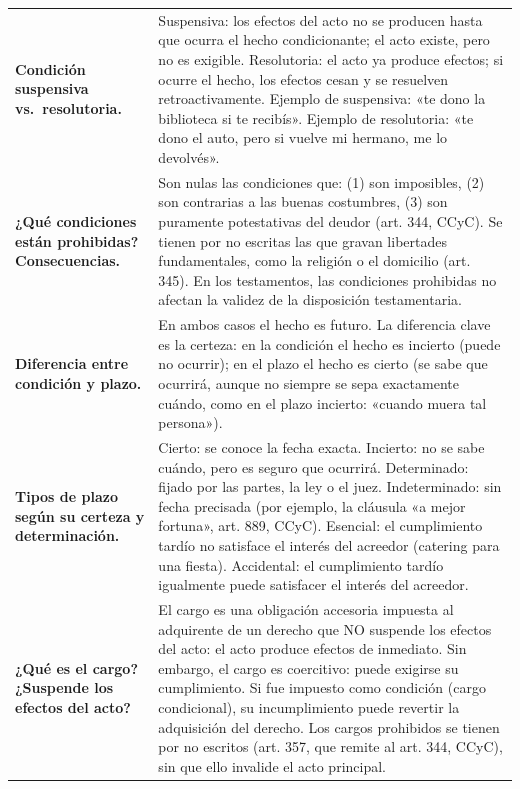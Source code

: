 \documentclass[12pt,oneside]{book}
\begin{document}
\begin{longtable}{
    >{\raggedright\arraybackslash}p{}
    >{\raggedright\arraybackslash}p{}
}
\textbf{Condición suspensiva vs.\ resolutoria.} &
Suspensiva: los efectos del acto no se producen hasta que ocurra el hecho condicionante; el acto existe, pero no es exigible. Resolutoria: el acto ya produce efectos; si ocurre el hecho, los efectos cesan y se resuelven retroactivamente. Ejemplo de suspensiva: «te dono la biblioteca si te recibís». Ejemplo de resolutoria: «te dono el auto, pero si vuelve mi hermano, me lo devolvés». \\

\textbf{¿Qué condiciones están prohibidas? Consecuencias.} &
Son nulas las condiciones que: (1) son imposibles, (2) son contrarias a las buenas costumbres, (3) son puramente potestativas del deudor (art. 344, CCyC). Se tienen por no escritas las que gravan libertades fundamentales, como la religión o el domicilio (art. 345). En los testamentos, las condiciones prohibidas no afectan la validez de la disposición testamentaria. \\

\textbf{Diferencia entre condición y plazo.} &
En ambos casos el hecho es futuro. La diferencia clave es la certeza: en la condición el hecho es incierto (puede no ocurrir); en el plazo el hecho es cierto (se sabe que ocurrirá, aunque no siempre se sepa exactamente cuándo, como en el plazo incierto: «cuando muera tal persona»). \\

\textbf{Tipos de plazo según su certeza y determinación.} &
Cierto: se conoce la fecha exacta. Incierto: no se sabe cuándo, pero es seguro que ocurrirá. Determinado: fijado por las partes, la ley o el juez. Indeterminado: sin fecha precisada (por ejemplo, la cláusula «a mejor fortuna», art. 889, CCyC). Esencial: el cumplimiento tardío no satisface el interés del acreedor (catering para una fiesta). Accidental: el cumplimiento tardío igualmente puede satisfacer el interés del acreedor. \\

\textbf{¿Qué es el cargo? ¿Suspende los efectos del acto?} &
El cargo es una obligación accesoria impuesta al adquirente de un derecho que NO suspende los efectos del acto: el acto produce efectos de inmediato. Sin embargo, el cargo es coercitivo: puede exigirse su cumplimiento. Si fue impuesto como condición (cargo condicional), su incumplimiento puede revertir la adquisición del derecho. Los cargos prohibidos se tienen por no escritos (art. 357, que remite al art. 344, CCyC), sin que ello invalide el acto principal. \\


\end{longtable}
\end{document}
